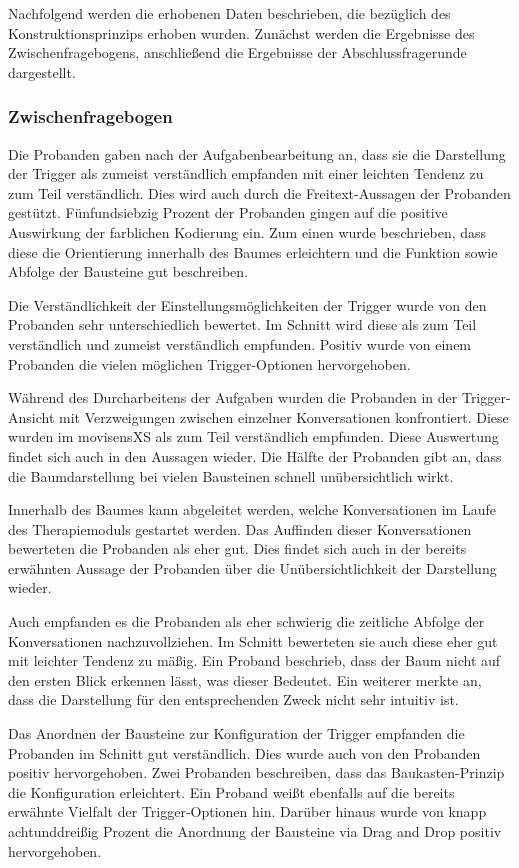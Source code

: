 Nachfolgend werden die erhobenen Daten beschrieben, die bezüglich des Konstruktionsprinzips erhoben wurden. Zunächst werden die Ergebnisse des Zwischenfragebogens, anschließend die Ergebnisse der Abschlussfragerunde dargestellt.

\subsubsection{Zwischenfragebogen}
Die Probanden gaben nach der Aufgabenbearbeitung an, dass sie die Darstellung der Trigger als zumeist verständlich empfanden mit einer leichten Tendenz zu zum Teil verständlich. Dies wird auch durch die Freitext-Aussagen der Probanden gestützt. Fünfundsiebzig Prozent der Probanden gingen auf die positive Auswirkung der farblichen Kodierung ein. Zum einen wurde beschrieben, dass diese die Orientierung innerhalb des Baumes erleichtern und die Funktion sowie Abfolge der Bausteine gut beschreiben.

Die Verständlichkeit der Einstellungsmöglichkeiten der Trigger wurde von den Probanden sehr unterschiedlich bewertet. Im Schnitt wird diese als zum Teil verständlich und zumeist verständlich empfunden. Positiv wurde von einem Probanden die vielen möglichen Trigger-Optionen hervorgehoben.

Während des Durcharbeitens der Aufgaben wurden die Probanden in der Trigger-Ansicht mit Verzweigungen zwischen einzelner Konversationen konfrontiert. Diese wurden im movisensXS als zum Teil verständlich empfunden. Diese Auswertung findet sich auch in den Aussagen wieder. Die Hälfte der Probanden gibt an, dass die Baumdarstellung bei vielen Bausteinen schnell unübersichtlich wirkt. 

Innerhalb des Baumes kann abgeleitet werden, welche Konversationen im Laufe des Therapiemoduls gestartet werden. Das Auffinden dieser Konversationen bewerteten die Probanden als eher gut. Dies findet sich auch in der bereits erwähnten Aussage der Probanden über die Unübersichtlichkeit der Darstellung wieder. 

Auch empfanden es die Probanden als eher schwierig die zeitliche Abfolge der Konversationen nachzuvollziehen. Im Schnitt bewerteten sie auch diese eher gut mit leichter Tendenz zu mäßig. Ein Proband beschrieb, dass der Baum nicht auf den ersten Blick erkennen lässt, was dieser Bedeutet. Ein weiterer merkte an, dass die Darstellung für den entsprechenden Zweck nicht sehr intuitiv ist. 

Das Anordnen der Bausteine zur Konfiguration der Trigger empfanden die Probanden im Schnitt gut verständlich. Dies wurde auch von den Probanden positiv hervorgehoben. Zwei Probanden beschreiben, dass das Baukasten-Prinzip die Konfiguration erleichtert. Ein Proband weißt ebenfalls auf die bereits erwähnte Vielfalt der Trigger-Optionen hin. Darüber hinaus wurde von knapp achtunddreißig Prozent die Anordnung der Bausteine via Drag and Drop positiv hervorgehoben.

